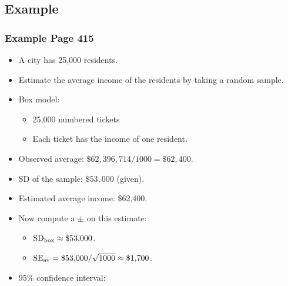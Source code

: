 \documentclass[t]{beamer}
\begin{document}
\subsection{Example}
\begin{frame}
\frametitle{Example Page 415}

\footnotesize 
\begin{itemize}
\item A city has 25,000 residents.
\item<2-> Estimate the average income of the residents by taking a random sample.
\item<3-> Box model: \vspace{-2pt}
   \begin{itemize}
   \item \scriptsize 25,000 numbered tickets
   \item \scriptsize Each ticket has the income of one resident.
   \end{itemize}
\item<4-> Observed average: $\$62,\!396,\!714 / 1000=\$62,400$.  
\item<5-> SD of the sample:  $\$53,\!000$ (given).  
\item<5-> Estimated average income:  \$62,400.
\item<6-> Now compute a $\pm$ on this estimate:
    \begin{itemize}
    \item $\mbox{SD}_{\mbox{\scriptsize box}}\approx \$53,\!000$.\vspace{2pt}
    \item $\mbox{SE}_{\mbox{\scriptsize av}} =\$53,\!000/\sqrt{1000}\approx \$1,\!700$.
    \end{itemize}
\item<7-> 95\% confidence interval:\vspace{-3pt}
\end{itemize}
\label{lastpage}
\end{frame}
\end{document}
